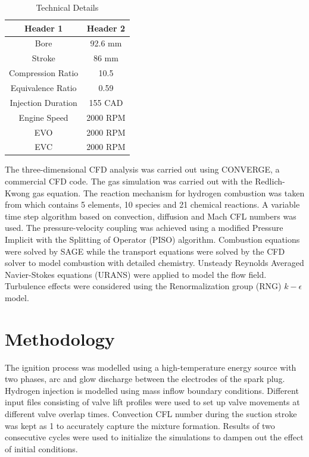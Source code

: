 \documentclass[conference]{IEEEtran}
\begin{document}
\begin{table}[!ht]
    \centering
    \caption{Technical Details}
    \label{your_label_here}
    \begin{tabular}{|c|c|}
    \hline
    Header 1 & Header 2 \\
    \hline
    Bore & 92.6 mm \\
    Stroke & 86 mm \\
    Compression Ratio & 10.5 \\
    Equivalence Ratio & 0.59 \\
    Injection Duration & 155 CAD \\
    Engine Speed & 2000 RPM \\
    EVO & 2000 RPM \\
    EVC & 2000 RPM \\
    \hline
    \end{tabular}
    \end{table}



The three-dimensional CFD analysis was carried out using CONVERGE, a commercial CFD code.
The gas simulation was carried out with the Redlich-Kwong gas equation. 
The reaction mechanism for hydrogen combustion was taken from \cite{b9} which contains 5 elements, 10 species and 21 chemical reactions. 
A variable time step algorithm based on convection, diffusion and Mach CFL numbers was used. 
The pressure-velocity coupling was achieved using a modified Pressure Implicit with the Splitting of Operator (PISO) algorithm. 
Combustion equations were solved by SAGE while the transport equations were solved by the CFD solver to model combustion with detailed chemistry.
Unsteady Reynolds Averaged Navier-Stokes equations (URANS) were applied to model the flow field.
Turbulence effects were considered using the Renormalization group (RNG) $k-\epsilon$ model.\\

\section{Methodology}

The ignition process was modelled using a high-temperature energy source with two phases, arc and glow discharge between the electrodes of the spark plug.
Hydrogen injection is modelled using mass inflow boundary conditions.
Different input files consisting of valve lift profiles were used to set up valve movements at different valve overlap times.
Convection CFL number during the suction stroke was kept as 1 to accurately capture the mixture formation.
Results of two consecutive cycles were used to initialize the simulations to dampen out the effect of initial conditions.\\
\end{document}

